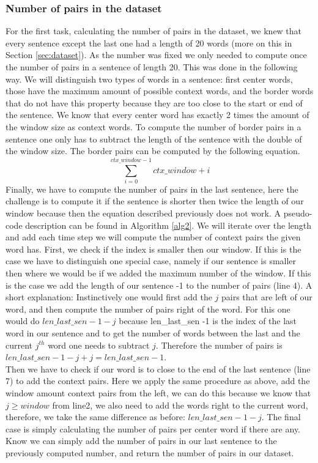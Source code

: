\subsubsection{Number of pairs in the dataset}
For the first task, calculating the number of pairs in the dataset, we knew that every sentence except the last one had a length of 20 words (more on this in Section \ref{sec:dataset}). As the number was fixed we only needed to compute once the number of pairs in a sentence of length 20. This was done in the following way. We will distinguish two types of words in a sentence: first center words, those have the maximum amount of possible context words, and the border words that do not have this property because they are too close to the start or end of the sentence.
We know that every center word has exactly 2 times the amount of the window size as context words. To compute the number of border pairs in a sentence one only has to subtract the length of the sentence with the double of the window size. The border pairs can be computed by the following equation. 
\begin{equation}
\sum_{i=0}^{ctx\_window -1} ctx\_window + i
\end{equation}
Finally, we have to compute the number of pairs in the last sentence, here the challenge is to compute it if the sentence is shorter then twice the length of our window because then the equation described previously does not work. A pseudo-code description can be found in Algorithm \ref{alg2}. We will iterate over the length and add each time step we will compute the number of context pairs the given word has. First, we check if the index is smaller then our window. If this is the case we have to distinguish one special case, namely if our sentence is smaller then where we would be if we added the maximum number of the window. If this is the case we add the length of our sentence -1 to the number of pairs (line 4). A short explanation: Instinctively one would first add the $j$ pairs that are left of our word, and then compute the number of pairs right of the word. For this one would do $len\_last\_sen -1 -j$ because len\_last\_sen -1  is the index of the last word in our sentence and to get the number of words between the last and the current $j^{th}$ word one needs to subtract $j$. Therefore the number of pairs is $len\_last\_sen -1 -j + j = len\_last\_sen -1$.\\ Then we have to check if our word is to close to the end of the last sentence (line 7) to add the context pairs. Here we apply the same procedure as above, add the window amount context pairs from the left, we can do this because we know that $j \geq window$ from line2, we also need to add the words right to the current word, therefore, we take the same difference as before: $len\_last\_sen -1 -j$.
The final case is simply calculating the number of pairs per center word if there are any. \\
Know we can simply add the number of pairs in our last sentence to the previously computed number, and return the number of pairs in our dataset.


